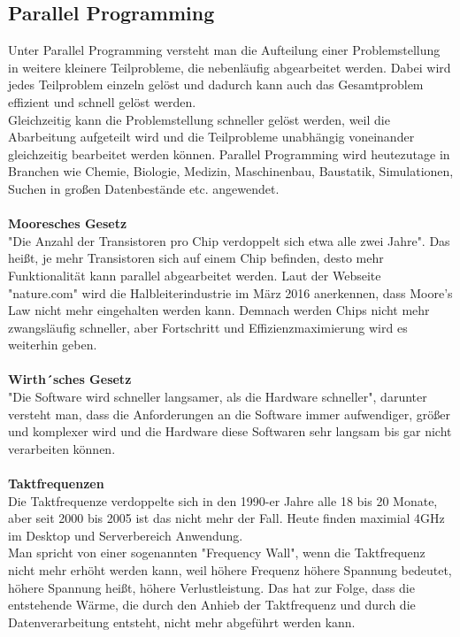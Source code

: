 \documentclass[a4paper,12pt]{article}
\begin{document}
\subsection{Parallel Programming}
Unter Parallel Programming versteht man die Aufteilung einer Problemstellung in weitere kleinere Teilprobleme, die nebenläufig abgearbeitet werden. Dabei wird jedes Teilproblem einzeln gelöst und dadurch kann auch das Gesamtproblem effizient und schnell gelöst werden. 
\\Gleichzeitig kann die Problemstellung schneller gelöst werden, weil die Abarbeitung aufgeteilt wird und die Teilprobleme unabhängig voneinander gleichzeitig bearbeitet werden können. Parallel Programming wird heutezutage in Branchen wie Chemie, Biologie, Medizin, Maschinenbau, Baustatik, Simulationen, Suchen in großen Datenbestände etc. angewendet.\\\\
\textbf{Mooresches Gesetz\\}
"Die Anzahl der Transistoren pro Chip verdoppelt sich etwa alle zwei Jahre". Das heißt, je mehr Transistoren sich auf einem Chip befinden, desto mehr Funktionalität kann parallel abgearbeitet werden. Laut der Webseite "nature.com" wird die Halbleiterindustrie im März 2016 anerkennen, dass Moore's Law nicht mehr eingehalten werden kann. Demnach werden Chips nicht mehr zwangsläufig schneller, aber Fortschritt und Effizienzmaximierung wird es weiterhin geben.\\\\
\textbf{Wirth´sches Gesetz\\}
"Die Software wird schneller langsamer, als die Hardware schneller", darunter versteht man, dass die Anforderungen an die Software immer aufwendiger, größer und komplexer wird und die Hardware diese Softwaren sehr langsam bis gar nicht verarbeiten können.\\\\
\textbf{Taktfrequenzen\\}
Die Taktfrequenze verdoppelte sich in den 1990-er Jahre alle 18 bis 20 Monate, aber seit 2000 bis 2005 ist das nicht mehr der Fall. Heute finden maximial 4GHz im Desktop und Serverbereich Anwendung.\\Man spricht von einer sogenannten "Frequency Wall", wenn die Taktfrequenz nicht mehr erhöht werden kann, weil höhere Frequenz höhere Spannung bedeutet, höhere Spannung heißt, höhere Verlustleistung. Das hat zur Folge, dass die entstehende Wärme, die durch den Anhieb der Taktfrequenz und durch die Datenverarbeitung entsteht, nicht mehr abgeführt werden kann.
\end{document}
